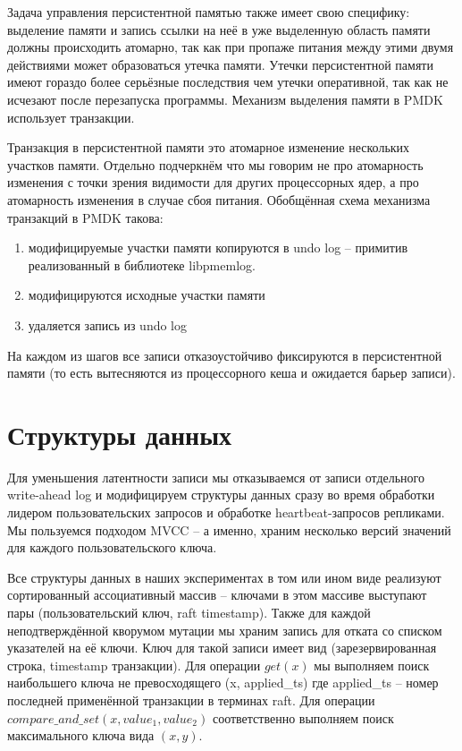 \documentclass[pdftex,ptm,12pt,a4paper]{report}
\theoremstyle{definition}
\begin{document}
\label{allocations}
Задача управления персистентной памятью также имеет свою специфику: выделение памяти и запись ссылки на неё в уже выделенную область памяти должны происходить атомарно, так как
при пропаже питания между этими двумя действиями может образоваться утечка памяти. Утечки персистентной памяти имеют гораздо более серьёзные последствия чем утечки оперативной,
так как не исчезают после перезапуска программы. Механизм выделения памяти в PMDK использует транзакции.

Транзакция в персистентной памяти это атомарное изменение нескольких участков памяти. Отдельно подчеркнём что мы говорим не про атомарность изменения с точки зрения видимости
для других процессорных ядер, а
про атомарность изменения в случае сбоя питания.
Обобщённая схема механизма транзакций в PMDK такова:
\begin{enumerate}
    \item модифицируемые участки памяти копируются в undo log -- примитив реализованный в библиотеке libpmemlog.
    \item модифицируются исходные участки памяти
    \item удаляется запись из undo log
\end{enumerate}
На каждом из шагов все записи отказоустойчиво фиксируются в персистентной памяти (то есть вытесняются из процессорного кеша и ожидается барьер записи).

\section{Структуры данных}
\label{datastructures}
Для уменьшения латентности записи мы отказываемся от записи отдельного write-ahead log и модифицируем структуры данных сразу во время обработки лидером пользовательских запросов
и обработке heartbeat-запросов репликами. 
Мы пользуемся подходом MVCC \cite{bernstein1983multiversion} -- а именно, храним несколько версий значений для каждого пользовательского ключа.

Все структуры данных в наших экспериментах в том или ином виде реализуют сортированный ассоциативный массив -- ключами в этом массиве выступают пары (пользовательский ключ, raft timestamp).
Также для каждой неподтверждённой кворумом мутации мы храним запись для отката со списком указателей на её ключи. Ключ для такой записи имеет вид
(зарезервированная строка, timestamp транзакции).
Для операции $get(x)$ мы выполняем поиск наибольшего ключа не превосходящего (x, applied\_ts) где applied\_ts -- номер последней применённой транзакции в терминах raft.
Для операции $compare\_and\_set(x, value_1, value_2)$ соответственно выполняем поиск максимального ключа вида $(x, y).$
\end{document}
